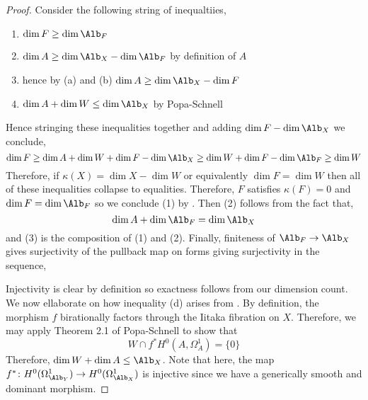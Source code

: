 \documentclass[12pt]{article}
\begin{document}
\begin{proof}
Consider the following string of inequaltiies,
\begin{enumerate}
\item $\dim{F} \ge \dim{\Alb_F}$ \cite[Theorem 1]{kawamata_abelian_varities}

\item $\dim{A} \ge \dim{\Alb_X} - \dim{\Alb_F}$ by definition of $A$

\item hence by (a) and (b) $\dim{A} \ge \dim{\Alb_X} - \dim{F}$

\item $\dim{A} + \dim{W} \le \dim{\Alb_X}$ by Popa-Schnell 
\end{enumerate}
Hence stringing these inequalities together and adding $\dim{F} - \dim{\Alb_X}$ we conclude,
\[ \dim{F} \ge \dim{A} + \dim{W} + \dim{F} - \dim{\Alb_X} \ge \dim{W} + \dim{F} - \dim{\Alb_F} \ge \dim{W} \]
Therefore, if $\kappa(X) = \dim{X} - \dim{W}$ or equivalently $\dim{F} = \dim{W}$ then all of these inequalities collapse to equalities. Therefore, $F$ satisfies $\kappa(F) = 0$ and $\dim{F} = \dim{\Alb_F}$ so we conclude (1) by \cite[Theorem 1]{kawamata_abelian_varieties}. Then (2) follows from the fact that,
\[ \dim{A} + \dim{\Alb_F} = \dim{\Alb_X} \]
and (3) is the composition of (1) and (2). Finally, finiteness of $\Alb_F \to \Alb_X$ gives surjectivity of the pullback map on forms giving surjectivity in the sequence,
\begin{center}
\end{center}
Injectivity is clear by definition so exactness follows from our dimension count. 
\bigskip\\
We now ellaborate on how inequality (d) arises from \cite{Popa-Schnell}. By definition, the morphism $f$ birationally factors through the Iitaka fibration on $X$. Therefore, we may apply Theorem 2.1 of Popa-Schnell to show that
\[ W \cap f^{*} H^{0}(A, \Omega_{A}^1) = \{ 0 \} \]
Therefore, $\dim W + \dim A \leq \Alb_{X}$. Note that here, the map $f^{\ast} \colon H^{0}(\Omega_{\Alb_{Y}}^{1}) \rightarrow H^{0}(\Omega_{\Alb_{X}}^{1})$ is injective since we have a generically smooth and dominant morphism.
\end{proof}
\end{document}
